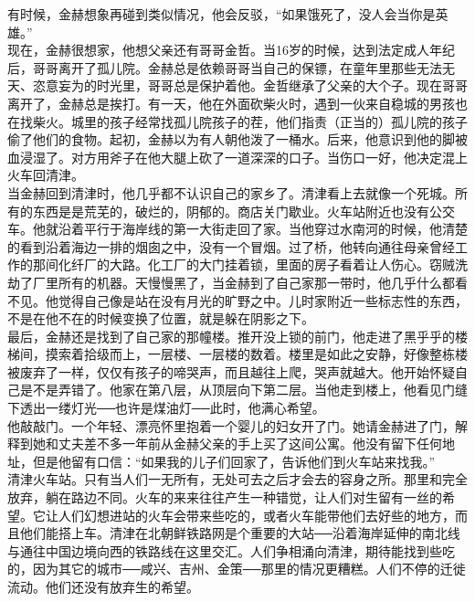 有时候，金赫想象再碰到类似情况，他会反驳，“如果饿死了，没人会当你是英雄。”\\

现在，金赫很想家，他想父亲还有哥哥金哲。当16岁的时候，达到法定成人年纪后，哥哥离开了孤儿院。金赫总是依赖哥哥当自己的保镖，在童年里那些无法无天、恣意妄为的时光里，哥哥总是保护着他。金哲继承了父亲的大个子。现在哥哥离开了，金赫总是挨打。有一天，他在外面砍柴火时，遇到一伙来自稳城的男孩也在找柴火。城里的孩子经常找孤儿院孩子的茬，他们指责（正当的）孤儿院的孩子偷了他们的食物。起初，金赫以为有人朝他泼了一桶水。后来，他意识到他的脚被血浸湿了。对方用斧子在他大腿上砍了一道深深的口子。当伤口一好，他决定混上火车回清津。\\

当金赫回到清津时，他几乎都不认识自己的家乡了。清津看上去就像一个死城。所有的东西是是荒芜的，破烂的，阴郁的。商店关门歇业。火车站附近也没有公交车。他就沿着平行于海岸线的第一大街走回了家。当他穿过水南河的时候，他清楚的看到沿着海边一排的烟囱之中，没有一个冒烟。过了桥，他转向通往母亲曾经工作的那间化纤厂的大路。化工厂的大门挂着锁，里面的房子看着让人伤心。窃贼洗劫了厂里所有的机器。天慢慢黑了，当金赫到了自己家那一带时，他几乎什么都看不见。他觉得自己像是站在没有月光的旷野之中。儿时家附近一些标志性的东西，不是在他不在的时候变换了位置，就是躲在阴影之下。\\

最后，金赫还是找到了自己家的那幢楼。推开没上锁的前门，他走进了黑乎乎的楼梯间，摸索着拾级而上，一层楼、一层楼的数着。楼里是如此之安静，好像整栋楼被废弃了一样，仅仅有孩子的啼哭声，而且越往上爬，哭声就越大。他开始怀疑自己是不是弄错了。他家在第八层，从顶层向下第二层。当他走到楼上，他看见门缝下透出一缕灯光──也许是煤油灯──此时，他满心希望。\\

他敲敲门。一个年轻、漂亮怀里抱着一个婴儿的妇女开了门。她请金赫进了门，解释到她和丈夫差不多一年前从金赫父亲的手上买了这间公寓。他没有留下任何地址，但是他留有口信：“如果我的儿子们回家了，告诉他们到火车站来找我。”\\

清津火车站。只有当人们一无所有，无处可去之后才会去的容身之所。那里和完全放弃，躺在路边不同。火车的来来往往产生一种错觉，让人们对生留有一丝的希望。它让人们幻想进站的火车会带来些吃的，或者火车能带他们去好些的地方，而且他们能搭上车。清津在北朝鲜铁路网是个重要的大站──沿着海岸延伸的南北线与通往中国边境向西的铁路线在这里交汇。人们争相涌向清津，期待能找到些吃的，因为其它的城市──咸兴、吉州、金策──那里的情况更糟糕。人们不停的迁徙流动。他们还没有放弃生的希望。\\


